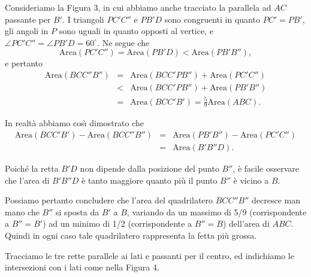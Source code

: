 {Consideriamo la Figura 3, in cui abbiamo anche tracciato la parallela ad $AC$ passante per $B'$.  I triangoli $PC'C''$ e $PB'D$ sono congruenti in quanto $PC'=PB'$, gli angoli in $P$ sono uguali in quanto opposti al vertice, e $\angle PC'C''=\angle PB'D=60^{\circ}$. Ne segue che
$$\mbox{Area}(PC'C'')=\mbox{Area}(PB'D)<\mbox{Area}(PB'B''),$$
e pertanto
\begin{eqnarray*}
    \mbox{Area}(BCC''B'') & = &
\mbox{Area}(BCC'PB'')+\mbox{Area}(PC'C'')  \\
     & < & \mbox{Area}(BCC'PB'')+\mbox{Area}(PB'B'')  \\
     & = & \mbox{Area}(BCC'B')=\frac{5}{9}\mbox{Area}(ABC).
\end{eqnarray*}

In realtà abbiamo cos\`{\i} dimostrato che
\begin{eqnarray*}
	\mbox{Area}(BCC'B')-\mbox{Area}(BCC''B'') & = &
	\mbox{Area}(PB'B'')-\mbox{Area}(PC'C'')  \\
	 & = & \mbox{Area}(B'B''D).
\end{eqnarray*}

Poiché la retta $B'D$ non dipende dalla posizione del punto $B''$, è facile osservare che l'area di $B'B''D$ è tanto maggiore quanto più il punto $B''$ è vicino a $B$.

Possiamo pertanto concludere che l'area del quadrilatero $BCC''B''$ decresce man mano che $B''$ si sposta da $B'$ a $B$, variando da un massimo di 5/9 (corrispondente a $B''=B'$) ad un minimo di 1/2 (corrispondente a $B''=B$) dell'area di $ABC$.  Quindi in ogni caso tale quadrilatero rappresenta la fetta più grossa.

\DomandaB Tracciamo le tre rette parallele ai lati e passanti per il
centro, ed indichiamo le intersezioni con i lati come nella Figura 4.

}
